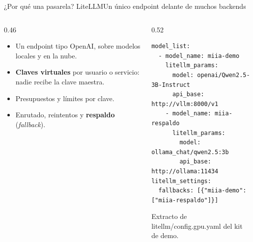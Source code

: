 \begin{frame}[fragile]{¿Por qué una pasarela? LiteLLM}{Un único endpoint delante de muchos backends}
	\begin{columns}[T]
		\begin{column}{0.46\textwidth}
			\footnotesize
			\begin{itemize}
				\item Un endpoint tipo OpenAI, sobre modelos locales y en la nube.
				\item \textbf{Claves virtuales} por usuario o servicio: nadie recibe la clave maestra.
				\item Presupuestos y límites por clave.
				\item Enrutado, reintentos y \textbf{respaldo} (\emph{fallback}).
			\end{itemize}
		\end{column}
		\begin{column}{0.52\textwidth}
			\begin{lstlisting}[language={}]
model_list:
  - model_name: miia-demo
    litellm_params:
      model: openai/Qwen2.5-3B-Instruct
      api_base: http://vllm:8000/v1
    - model_name: miia-respaldo
      litellm_params:
        model: ollama_chat/qwen2.5:3b
        api_base: http://ollama:11434
litellm_settings:
  fallbacks: [{"miia-demo": ["miia-respaldo"]}]
\end{lstlisting}
			{\tiny\color{darkgray} Extracto de litellm/config.gpu.yaml del kit de demo.}
		\end{column}
	\end{columns}
\end{frame}

